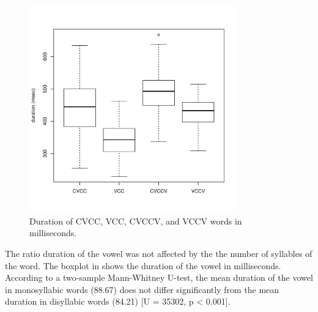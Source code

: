 \documentclass[11pt,a4paper,openany]{memoir}\usepackage[]{graphicx}\usepackage[]{color}
\newenvironment{knitrout}{}{} %
\begin{document}
\begin{figure}
\centering
\begin{knitrout}
\color{fgcolor}
\includegraphics[width=0.8\textwidth]{img/word-duration-1} 

\end{knitrout}
\caption{Duration of CVCC, VCC, CVCCV, and VCCV words in milliseconds.}
\label{f:worddur}
\end{figure}



The ratio duration of the vowel was not affected by the the number of syllables of the word.
The boxplot in  shows the duration of the vowel in milliseconds.
According to a two-sample Mann-Whitney U-test, the mean duration of the vowel in monosyllabic words (88.67) does not differ significantly from the mean duration in disyllabic words (84.21) [U = 35302, p < 0.001].
\end{document}
